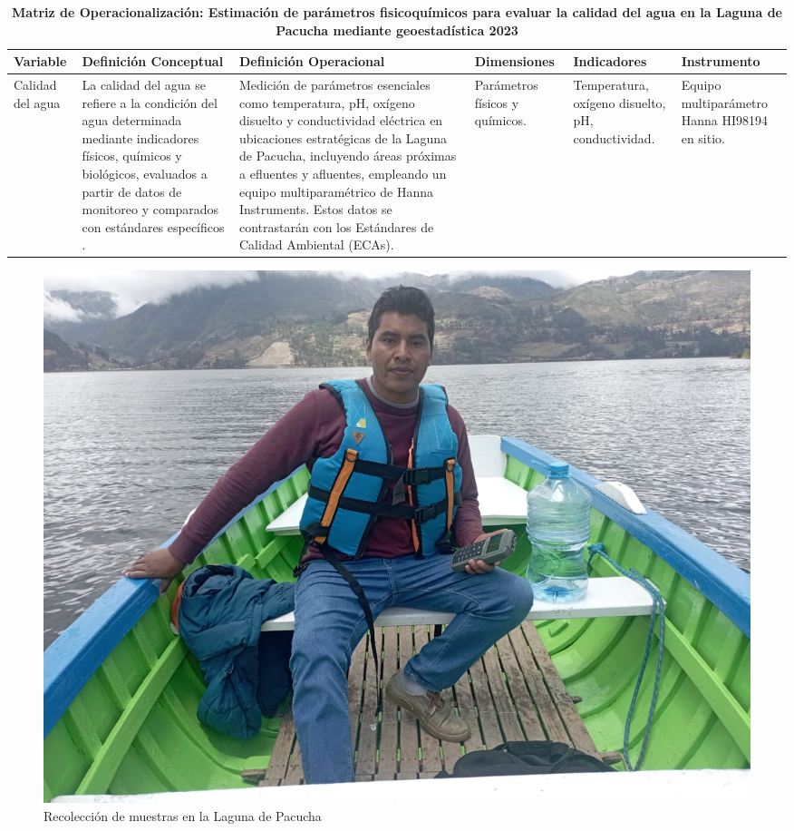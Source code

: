 

\begin{landscape}
\tiny %
\setlength{\tabcolsep}{4pt} %
\renewcommand{\arraystretch}{1.5} %

\begin{table}[ht]
\centering
\caption{\textbf{Matriz de Operacionalización: Estimación de parámetros fisicoquímicos para evaluar la calidad del agua en la Laguna de Pacucha mediante geoestadística 2023}}
\begin{tabularx}{\linewidth}{|X|X|X|X|X|X|}
\hline
\textbf{Variable} & \textbf{Definición Conceptual} & \textbf{Definición Operacional} & \textbf{Dimensiones} & \textbf{Indicadores} & \textbf{Instrumento} \\
\hline
Calidad del agua & La calidad del agua se refiere a la condición del agua determinada mediante indicadores físicos, químicos y biológicos, evaluados a partir de datos de monitoreo y comparados con estándares específicos \cite{Li2019}. & Medición de parámetros esenciales como temperatura, pH, oxígeno disuelto y conductividad eléctrica en ubicaciones estratégicas de la Laguna de Pacucha, incluyendo áreas próximas a efluentes y afluentes, empleando un equipo multiparamétrico de Hanna Instruments. Estos datos se contrastarán con los Estándares de Calidad Ambiental (ECAs). & Parámetros físicos y químicos. & Temperatura, oxígeno disuelto, pH, conductividad. & Equipo multiparámetro Hanna HI98194 en sitio. \\
\hline
\end{tabularx}
\end{table}
\end{landscape}




\begin{figure}
    \centering
    \includegraphics[width=1\linewidth]{Anexos/teybi.jpeg}
    \caption{Recolección de muestras en la Laguna de Pacucha}
    \label{fig:enter-label}
\end{figure}

